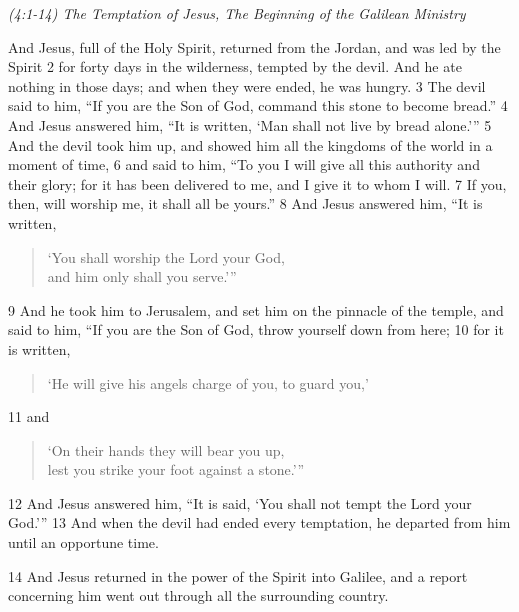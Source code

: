 \documentclass[letterpaper]{report}
\begin{document}
{\centering
	\emph{(4:1-14) The Temptation of Jesus,
		The Beginning of the Galilean Ministry}\\
}
\begin{multicols}{2}
And Jesus, full of the Holy Spirit, returned from the Jordan, and was led by the Spirit 2 for forty days in the wilderness, tempted by the devil. And he ate nothing in those days; and when they were ended, he was hungry. 3 The devil said to him, “If you are the Son of God, command this stone to become bread.” 4 And Jesus answered him, “It is written, ‘Man shall not live by bread alone.’” 5 And the devil took him up, and showed him all the kingdoms of the world in a moment of time, 6 and said to him, “To you I will give all this authority and their glory; for it has been delivered to me, and I give it to whom I will. 7 If you, then, will worship me, it shall all be yours.” 8 And Jesus answered him, “It is written,

\begin{verse}
‘You shall worship the Lord your God,\\
and him only shall you serve.’”\\
\end{verse}

9 And he took him to Jerusalem, and set him on the pinnacle of the temple, and said to him, “If you are the Son of God, throw yourself down from here; 10 for it is written,

\begin{verse}
‘He will give his angels charge of you, to guard you,’\\
\end{verse}

11 and

\begin{verse}
‘On their hands they will bear you up,\\
lest you strike your foot against a stone.’”\\
\end{verse}

12 And Jesus answered him, “It is said, ‘You shall not tempt the Lord your God.’” 13 And when the devil had ended every temptation, he departed from him until an opportune time.

14 And Jesus returned in the power of the Spirit into Galilee, and a report concerning him went out through all the surrounding country.

\end{multicols}

\clearpage
\end{document}
